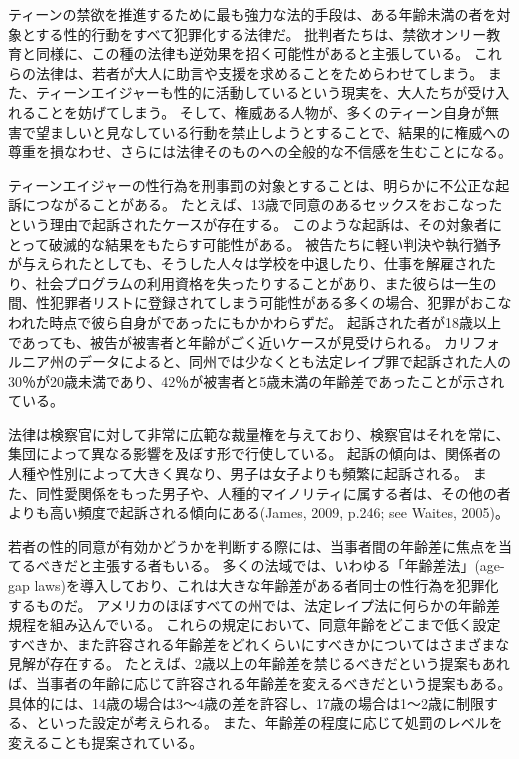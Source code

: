 \documentclass[paper=a4,book,openany]{jlreq} \usepackage{mystyle}
\begin{document}
ティーンの禁欲を推進するために最も強力な法的手段は、ある年齢未満の者を対象とする性的行動をすべて犯罪化する法律だ。
批判者たちは、禁欲オンリー教育と同様に、この種の法律も逆効果を招く可能性があると主張している。
これらの法律は、若者が大人に助言や支援を求めることをためらわせてしまう。
また、ティーンエイジャーも性的に活動しているという現実を、大人たちが受け入れることを妨げてしまう。
そして、権威ある人物が、多くのティーン自身が無害で望ましいと見なしている行動を禁止しようとすることで、結果的に権威への尊重を損なわせ、さらには法律そのものへの全般的な不信感を生むことになる。

ティーンエイジャーの性行為を刑事罰の対象とすることは、明らかに不公正な起訴につながることがある。
たとえば、13歳で同意のあるセックスをおこなったという理由で起訴されたケースが存在する。
このような起訴は、その対象者にとって破滅的な結果をもたらす可能性がある。
被告たちに軽い判決や執行猶予が与えられたとしても、そうした人々は学校を中退したり、仕事を解雇されたり、社会プログラムの利用資格を失ったりすることがあり、また彼らは一生の間、性犯罪者リストに登録されてしまう可能性がある{\DDASH}多くの場合、犯罪がおこなわれた時点で彼ら自身がであったにもかかわらずだ。
起訴された者が18歳以上であっても、被告が被害者と年齢がごく近いケースが見受けられる。
カリフォルニア州のデータによると、同州では少なくとも法定レイプ罪で起訴された人の30％が20歳未満であり、42％が被害者と5歳未満の年齢差であったことが示されている\citep[pp. 51--52]{ccasa2008}。

法律は検察官に対して非常に広範な裁量権を与えており、検察官はそれを常に、集団によって異なる影響を及ぼす形で行使している。
起訴の傾向は、関係者の人種や性別によって大きく異なり、男子は女子よりも頻繁に起訴される。
また、同性愛関係をもった男子や、人種的マイノリティに属する者は、その他の者よりも高い頻度で起訴される傾向にある(James, 2009, p.246; see Waites, 2005)。
\nocite{james09:_romeo_juliet_were_sex_offen}\nocite{waites04:_age_consen_sexual_consen}

若者の性的同意が有効かどうかを判断する際には、当事者間の年齢差に焦点を当てるべきだと主張する者もいる。
多くの法域では、いわゆる「年齢差法」(age-gap laws)を導入しており、これは大きな年齢差がある者同士の性行為を犯罪化するものだ。
アメリカのほぼすべての州では、法定レイプ法に何らかの年齢差規程を組み込んでいる。
これらの規定において、同意年齢をどこまで低く設定すべきか、また許容される年齢差をどれくらいにすべきかについてはさまざまな見解が存在する。
たとえば、2歳以上の年齢差を禁じるべきだという提案もあれば\citep{waites04:_age_consen_sexual_consen}、当事者の年齢に応じて許容される年齢差を変えるべきだという提案もある。
具体的には、14歳の場合は3～4歳の差を許容し、17歳の場合は1～2歳に制限する、といった設定が考えられる。
また、年齢差の程度に応じて処罰のレベルを変えることも提案されている。
\end{document}
